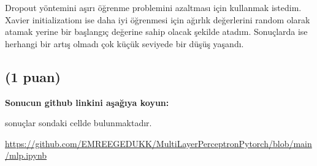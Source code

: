 \documentclass[11pt]{article}
\begin{document}
Dropout yöntemini aşırı öğrenme problemini azaltması için kullanmak istedim. Xavier initializationı ise daha iyi öğrenmesi için ağırlık değerlerini random olarak atamak yerine bir başlangıç değerine sahip olacak şekilde atadım. Sonuçlarda ise herhangi bir artış olmadı çok küçük seviyede bir düşüş yaşandı.

\subsection{(1 puan)} \textbf{Sonucun github linkini  aşağıya koyun:}

{sonuçlar sondaki cellde bulunmaktadır. }

\url{https://github.com/EMREEGEDUKK/MultiLayerPerceptronPytorch/blob/main/mlp.ipynb}
\end{document}
